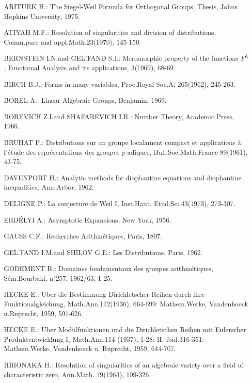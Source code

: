 \begin{thebibliography}{99}\pageoriginale
{} ARITURK H.: The Siegel-Weil Formula for Orthogonal
  Groups, Thesis, Johns Hopkins University, 1975.

 ATIYAH M.F.: Resolution of singularities and division of
  distributions, Comm.\@ pure and appl.\@ Math.\@ 23(1970), 145-150.

 BERNSTEIN I.N.\@ and GEL'FAND S.I.: Meromorphic
  property of the functions $P^{\lambda}$, Functional Analysis and its
  applications, 3(1969), 68-69.

 BIRCH B.J.: Forms in many variables, Proc.\@ Royal
  Soc.\@ A, 265(1962), 245-263.

 BOREL A.: Linear Algebraic Groups, Benjamin, 1969.

 BOREVICH Z.I.\@ and SHAFAREVICH I.R.: Number Theory,
  Academic Press, 1966.

 BRUHAT F.: Distributions sur un groupe localament
  compact et applications \`a l'\'etude des repr\'esentations des
  groupes $p$-adiques, Bull.\@ Soc.\@ Math.\@ France 89(1961), 43-75. 

 DAVENPORT H.: Analytic methods for diophantine equations
  and diophantine inequalities, Ann Arbor, 1962.

 DELIGNE P.: La conjecture de Weil I, Inst.\@ Haut.\@
  Etud.\@ Sci.\@ 43(1973), 273-307.

 ERD\'ELYI A.: Asymptotic Expansions, New York, 1956.

 GAUSS C.F.: Recherches Arithm\'etiques, Paris,  1807.

 GEL'FAND I.M.\@ and SHILOV G.E.: Les Distributions,
  Paris, 1962.

 GODEMENT R.: Domaines fondamentaux des groupes
  arithm\'etiques, S\'em.\@ Bourbaki, n$^{\circ}$257, 1962/63, 1-25.

 HECKE E.: Uber die Bestimmung Dirichletscher Reihen
  durch ihre Funktionalgleichung, Math.\@ Ann.\@ 112(1936), 664-699:
  Mathem.\@ Werke, Vandenhoeck u.\@ Ruprecht, 1959, 591-626.

 HECKE E.: Uber Modulfunktionen und die Dirichletschen
  Reihen mit Eulerscher Produktentwicklung I, Math.\@ Ann.\@ 114
  (1937), 1-28; II, ibid.\@ 316-351: Mathem.\@ Werke, Vandenhoeck u.\@
  Ruprecht, 1959, 644-707.

 HIRONAKA H.: Resolution of singularities of an algebraic
  variety over a field of characteristic zero, Ann.\@ Math.\@
  79(1964), 109-326.


\end{thebibliography}
